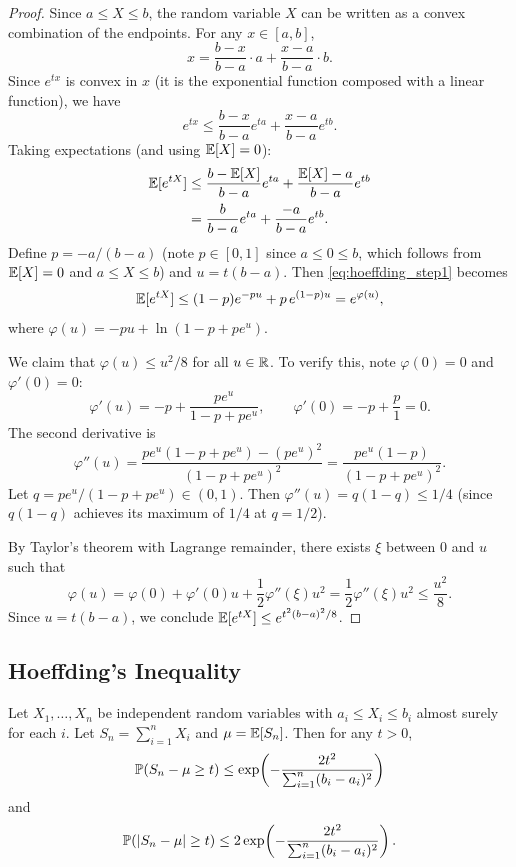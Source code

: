 \documentclass[11pt,a4paper]{article}
\begin{document}
\begin{proof}
Since $a \leq X \leq b$, the random variable $X$ can be written as
a convex combination of the endpoints. For any $x \in [a, b]$,
\[
    x = \frac{b - x}{b - a} \cdot a + \frac{x - a}{b - a} \cdot b.
\]
Since $e^{tx}$ is convex in $x$ (it is the exponential function
composed with a linear function), we have
\[
    e^{tx} \leq \frac{b - x}{b - a} e^{ta} + \frac{x - a}{b - a} e^{tb}.
\]
Taking expectations (and using $\mathbb{E}[X] = 0$):
\begin{align}
    \mathbb{E}[e^{tX}] &\leq \frac{b - \mathbb{E}[X]}{b - a} e^{ta}
    + \frac{\mathbb{E}[X] - a}{b - a} e^{tb} \nonumber \\
    &= \frac{b}{b - a} e^{ta} + \frac{-a}{b - a} e^{tb}. \label{eq:hoeffding_step1}
\end{align}
Define $p = -a/(b-a)$ (note $p \in [0,1]$ since $a \leq 0 \leq b$,
which follows from $\mathbb{E}[X] = 0$ and $a \leq X \leq b$) and
$u = t(b-a)$. Then \eqref{eq:hoeffding_step1} becomes
\[
    \mathbb{E}[e^{tX}] \leq (1-p) e^{-pu} + p \, e^{(1-p)u}
    = e^{\varphi(u)},
\]
where $\varphi(u) = -pu + \ln(1 - p + pe^u)$.

We claim that $\varphi(u) \leq u^2/8$ for all $u \in \mathbb{R}$. To
verify this, note $\varphi(0) = 0$ and $\varphi'(0) = 0$:
\[
    \varphi'(u) = -p + \frac{pe^u}{1 - p + pe^u},
    \qquad
    \varphi'(0) = -p + \frac{p}{1} = 0.
\]
The second derivative is
\[
    \varphi''(u) = \frac{pe^u(1 - p + pe^u) - (pe^u)^2}{(1-p+pe^u)^2}
    = \frac{pe^u(1-p)}{(1-p+pe^u)^2}.
\]
Let $q = pe^u / (1 - p + pe^u) \in (0,1)$. Then
$\varphi''(u) = q(1-q) \leq 1/4$
(since $q(1-q)$ achieves its maximum of $1/4$ at $q = 1/2$).

By Taylor's theorem with Lagrange remainder, there exists $\xi$
between $0$ and $u$ such that
\[
    \varphi(u) = \varphi(0) + \varphi'(0)u + \frac{1}{2}\varphi''(\xi)u^2
    = \frac{1}{2}\varphi''(\xi)u^2
    \leq \frac{u^2}{8}.
\]
Since $u = t(b-a)$, we conclude
$\mathbb{E}[e^{tX}] \leq e^{t^2(b-a)^2/8}$.
\end{proof}

\subsection{Hoeffding's Inequality}

\begin{theorem}
\label{thm:hoeffding}
Let $X_1, \ldots, X_n$ be independent random variables with
$a_i \leq X_i \leq b_i$ almost surely for each $i$. Let
$S_n = \sum_{i=1}^n X_i$ and $\mu = \mathbb{E}[S_n]$. Then for any
$t > 0$,
\[
    \mathbb{P}(S_n - \mu \geq t)
    \leq \exp\!\left(-\frac{2t^2}{\sum_{i=1}^n (b_i - a_i)^2}\right)
\]
and
\[
    \mathbb{P}(|S_n - \mu| \geq t)
    \leq 2\exp\!\left(-\frac{2t^2}{\sum_{i=1}^n (b_i - a_i)^2}\right).
\]
\end{theorem}
\end{document}

